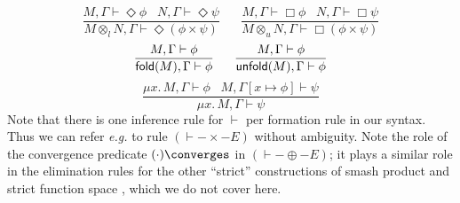 \[ \frac{M, \Gamma \vdash \Diamond \phi \;\;\; N, \Gamma 
\vdash \Diamond \psi}{M \otimes_{l} N, \Gamma \vdash \Diamond (\phi \times \psi )} \;\;\;\;\;\;
   \frac{M, \Gamma \vdash \Box \phi \;\;\; N, \Gamma
\vdash \Box \psi}{M \otimes_{u} N, \Gamma \vdash
\Box (\phi \times \psi )} \]
\[ \frac{M, \Gamma \vdash \phi}{{\sf fold}(M), \Gamma \vdash \phi} \;\;\;\;\;\;
   \frac{M, \Gamma \vdash \phi}{{\sf unfold}(M), \Gamma \vdash \phi} \]
\[ \frac{\mu x . \, M, \Gamma \vdash \phi \;\;\; M, \Gamma [x \mapsto \phi ]
\vdash \psi}{\mu x . \, M, \Gamma \vdash \psi} \]
Note that there is one inference rule for $\vdash$ per formation rule in
our syntax.
Thus we can refer {\it e.g.} to rule $({\vdash}-{\times}-E)$ without ambiguity.
Note the role of the convergence predicate $( \cdot ) \converges$ in 
$({\vdash}-{\oplus}-E)$; it plays a similar role in the elimination rules
for the other ``strict'' constructions of smash product \cite[Chapter 3 p.\  1]{PloLN} and strict 
function space \cite[Chapter 1 p.\ 11]{PloLN},
which we do not cover here.
